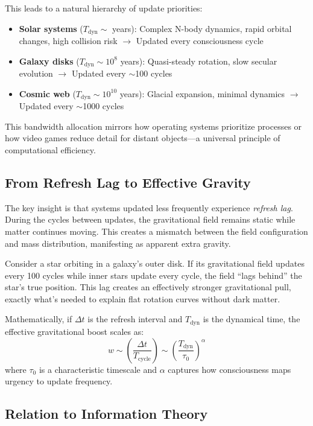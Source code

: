 \documentclass[twocolumn,prd,amsmath,amssymb,aps,superscriptaddress,nofootinbib]{revtex4-2}
\begin{document}
This leads to a natural hierarchy of update priorities:

\begin{itemize}
\item \textbf{Solar systems} ($T_{\text{dyn}} \sim$ years): Complex N-body dynamics, rapid orbital changes, high collision risk $\rightarrow$ Updated every consciousness cycle
\item \textbf{Galaxy disks} ($T_{\text{dyn}} \sim 10^8$ years): Quasi-steady rotation, slow secular evolution $\rightarrow$ Updated every $\sim$100 cycles
\item \textbf{Cosmic web} ($T_{\text{dyn}} \sim 10^{10}$ years): Glacial expansion, minimal dynamics $\rightarrow$ Updated every $\sim$1000 cycles
\end{itemize}

This bandwidth allocation mirrors how operating systems prioritize processes or how video games reduce detail for distant objects---a universal principle of computational efficiency.

\subsection{From Refresh Lag to Effective Gravity}

The key insight is that systems updated less frequently experience \emph{refresh lag}. During the cycles between updates, the gravitational field remains static while matter continues moving. This creates a mismatch between the field configuration and mass distribution, manifesting as apparent extra gravity.

Consider a star orbiting in a galaxy's outer disk. If its gravitational field updates every 100 cycles while inner stars update every cycle, the field ``lags behind'' the star's true position. This lag creates an effectively stronger gravitational pull, exactly what's needed to explain flat rotation curves without dark matter.

Mathematically, if $\Delta t$ is the refresh interval and $T_{\text{dyn}}$ is the dynamical time, the effective gravitational boost scales as:
\begin{equation}
w \sim \left(\frac{\Delta t}{T_{\text{cycle}}}\right) \sim \left(\frac{T_{\text{dyn}}}{\tau_0}\right)^\alpha
\label{eq:boost_scaling}
\end{equation}
where $\tau_0$ is a characteristic timescale and $\alpha$ captures how consciousness maps urgency to update frequency.

\subsection{Relation to Information Theory}
\end{document}

